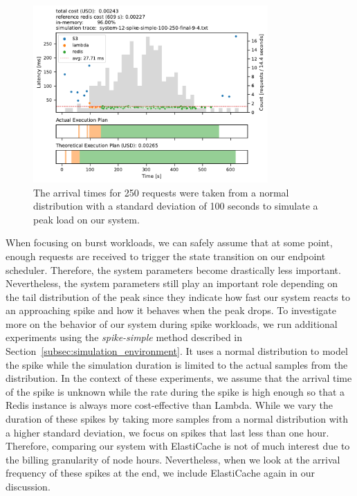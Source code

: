 \begin{figure}[t]
    \begin{center}
        \includegraphics[width=0.8\textwidth]{figures/system-12-spike-simple-100-250-final-9-4.pdf}
        \caption{The arrival times for 250 requests were taken from a normal distribution with a standard deviation of 100 seconds to simulate a peak load on our system.}
        \label{fig:spike_2}
    \end{center}
\end{figure}
When focusing on burst workloads, we can safely assume that at some point, enough requests are received to trigger the state transition on our endpoint scheduler. Therefore, the system parameters become drastically less important. Nevertheless, the system parameters still play an important role depending on the tail distribution of the peak since they indicate how fast our system reacts to an approaching spike and how it behaves when the peak drops. To investigate more on the behavior of our system during spike workloads, we run additional experiments using the \emph{spike-simple} method described in Section~\ref{subsec:simulation_environment}. It uses a normal distribution to model the spike while the simulation duration is limited to the actual samples from the distribution. In the context of these experiments, we assume that the arrival time of the spike is unknown while the rate during the spike is high enough so that a Redis instance is always more cost-effective than Lambda. While we vary the duration of these spikes by taking more samples from a normal distribution with a higher standard deviation, we focus on spikes that last less than one hour. Therefore, comparing our system with ElastiCache is not of much interest due to the billing granularity of node hours. Nevertheless, when we look at the arrival frequency of these spikes at the end, we include ElastiCache again in our discussion. 

